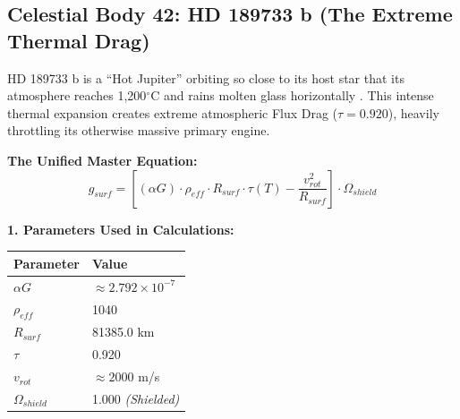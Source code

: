 \documentclass[11pt, a4paper]{article}
\begin{document}
\clearpage
\subsection{Celestial Body 42: HD 189733 b (The Extreme Thermal Drag)}
  HD 189733 b is a ``Hot Jupiter'' orbiting so close to its host star that its atmosphere reaches 1,200$^\circ$C and rains molten glass horizontally \cite{bouchy2005}. This intense thermal expansion creates extreme atmospheric Flux Drag ($\tau = 0.920$), heavily throttling its otherwise massive primary engine.

  \vspace{0.5em}
  \noindent \textbf{The Unified Master Equation:}
  $$ g_{surf} = \left[ (\alpha G) \cdot \rho_{eff} \cdot R_{surf} \cdot \tau(T) - \frac{v_{rot}^2}{R_{surf}} \right] \cdot \Omega_{shield} $$

  \vspace{0.5em}
  \noindent \textbf{1. Parameters Used in Calculations:} \\[0.5em]
  \begingroup
  \renewcommand{\arraystretch}{1.3}
  \hspace*{2em}
  \begin{tabular}{|l|l|}
    \hline
    \textbf{Parameter} & \textbf{Value} \\ \hline
    $\alpha G$ & $\approx 2.792 \times 10^{-7}$ \\ \hline
    $\rho_{eff}$ & 1040 \\ \hline
    $R_{surf}$ & 81385.0 km \\ \hline
    $\tau$ & 0.920 \\ \hline
    $v_{rot}$ & $\approx 2000$ m/s \\ \hline
    $\Omega_{shield}$ & 1.000 \textit{(Shielded)} \\ \hline
  \end{tabular}
  \endgroup
\end{document}
